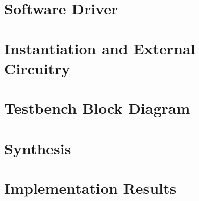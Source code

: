 \documentclass{\TEX/ug/ug}
\begin{document}
\ifnum{}
\section{Software Driver}
\label{sec:sw}

\fi

\section{Instantiation and External Circuitry}
\label{sec:inst}


\section{Testbench Block Diagram}
\label{sec:tbbd}


\section{Synthesis}
\label{sec:synth}


\section{Implementation Results}
\label{sec:results}


\ifnum{}

\fi
\end{document}
